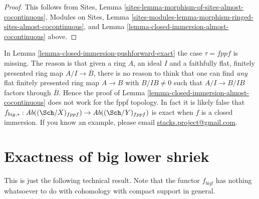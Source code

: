 \begin{proof}
This follows from
Sites, Lemma \ref{sites-lemma-morphism-of-sites-almost-cocontinuous},
Modules on Sites,
Lemma \ref{sites-modules-lemma-morphism-ringed-sites-almost-cocontinuous},
and
Lemma \ref{lemma-closed-immersion-almost-cocontinuous}
above.
\end{proof}

\begin{remark}
\label{remark-fppf-closed-immersion-not-closed}
In Lemma \ref{lemma-closed-immersion-pushforward-exact} the case $\tau = fppf$
is missing. The reason is that given a ring $A$, an ideal $I$ and a
faithfully flat, finitely presented ring map $A/I \to \overline{B}$, there
is no reason to think that one can find {\it any} flat finitely presented ring
map $A \to B$ with $B/IB \not = 0$ such that $A/I \to B/IB$ factors through
$\overline{B}$. Hence the proof of
Lemma \ref{lemma-closed-immersion-almost-cocontinuous}
does not work for the fppf topology.
In fact it is likely false that
$f_{big, *} : \textit{Ab}((\Sch/X)_{fppf})
\to \textit{Ab}((\Sch/Y)_{fppf})$
is exact when $f$ is a closed immersion.
If you know an example, please email
\href{mailto:stacks.project@gmail.com}{stacks.project@gmail.com}.
\end{remark}












\section{Exactness of big lower shriek}
\label{section-exactness-lower-shriek}

\noindent
This is just the following technical result. Note that the functor $f_{big!}$
has nothing whatsoever to do with cohomology with compact support in
general.

